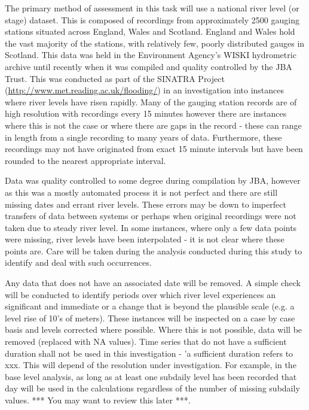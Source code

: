 \documentclass[DIV=calc, paper=a4, fontsize=11pt, twocolumn]{scrartcl}	 %
\begin{document}
The primary method of assessment in this task will use a national river level (or stage) dataset. This is composed of recordings from approximately 2500 gauging stations situated across England, Wales and Scotland. England and Wales hold the vast majority of the stations, with relatively few, poorly distributed gauges in Scotland. This data was held in the Environment Agency's WISKI hydrometric archive until recently when it was compiled and quality controlled by the JBA Trust. This was conducted as part of the SINATRA Project (\url{http://www.met.reading.ac.uk/flooding/}) in an investigation into instances where river levels have risen rapidly. Many of the gauging station records are of high resolution with recordings every 15 minutes however there are instances where this is not the case or where there are gaps in the record - these can range in length from a single recording to many years of data. Furthermore, these recordings may not have originated from exact 15 minute intervals but have been rounded to the nearest appropriate interval.

Data was quality controlled to some degree during compilation by JBA, however as this was a mostly automated process it is not perfect and there are still missing dates and errant river levels. These errors may be down to imperfect transfers of data between systems or perhaps when original recordings were not taken due to steady river level. In some instances, where only a few data points were missing, river levels have been interpolated - it is not clear where these points are. Care will be taken during the analysis conducted during this study to identify and deal with such occurrences.

Any data that does not have an associated date will be removed. A simple check will be conducted to identify periods over which river level experiences an significant and immediate or a change that is beyond the plausible scale (e.g. a level rise of 10's of meters). These instances will be inspected on a case by case basis and levels corrected where possible. Where this is not possible, data will be removed (replaced with NA values). Time series that do not have a sufficient duration shall not be used in this investigation - 'a sufficient duration refers to xxx. This will depend of the resolution under investigation. For example, in the base level analysis, as long as at least one subdaily level has been recorded that day will be used in the calculations regardless of the number of missing subdaily values. *** You may want to review this later ***.
\end{document}
